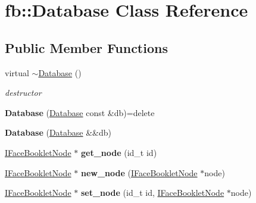 \hypertarget{classfb_1_1_database}{\section{fb\+:\+:Database Class Reference}
\label{classfb_1_1_database}
}
\subsection*{Public Member Functions}
\begin{DoxyCompactItemize}
\item 
\hypertarget{classfb_1_1_database_a2de495f81b6f6d7fb5ea886214de85cc}{virtual \hyperlink{classfb_1_1_database_a2de495f81b6f6d7fb5ea886214de85cc}{$\sim$\+Database} ()}\label{classfb_1_1_database_a2de495f81b6f6d7fb5ea886214de85cc}

\begin{DoxyCompactList}\small\item\em destructor \end{DoxyCompactList}\item 
\hypertarget{classfb_1_1_database_ad1cececc4f2a99deca58128655169131}{{\bfseries Database} (\hyperlink{classfb_1_1_database}{Database} const \&db)=delete}\label{classfb_1_1_database_ad1cececc4f2a99deca58128655169131}

\item 
\hypertarget{classfb_1_1_database_ac3ef421b9a418f433ea7c2de5b7232e7}{{\bfseries Database} (\hyperlink{classfb_1_1_database}{Database} \&\&db)}\label{classfb_1_1_database_ac3ef421b9a418f433ea7c2de5b7232e7}

\item 
\hypertarget{classfb_1_1_database_a37037408e2ece4145b6d5487b3fff140}{\hyperlink{structfb_1_1_i_face_booklet_node}{I\+Face\+Booklet\+Node} $\ast$ {\bfseries get\+\_\+node} (id\+\_\+t id)}\label{classfb_1_1_database_a37037408e2ece4145b6d5487b3fff140}

\item 
\hypertarget{classfb_1_1_database_a6c7d28b50a83abc53dea5957231cba36}{\hyperlink{structfb_1_1_i_face_booklet_node}{I\+Face\+Booklet\+Node} $\ast$ {\bfseries new\+\_\+node} (\hyperlink{structfb_1_1_i_face_booklet_node}{I\+Face\+Booklet\+Node} $\ast$node)}\label{classfb_1_1_database_a6c7d28b50a83abc53dea5957231cba36}

\item 
\hypertarget{classfb_1_1_database_a33759a955ab671e0fe014d478250cdc2}{\hyperlink{structfb_1_1_i_face_booklet_node}{I\+Face\+Booklet\+Node} $\ast$ {\bfseries set\+\_\+node} (id\+\_\+t id, \hyperlink{structfb_1_1_i_face_booklet_node}{I\+Face\+Booklet\+Node} $\ast$node)}\label{classfb_1_1_database_a33759a955ab671e0fe014d478250cdc2}


\end{DoxyCompactItemize}
